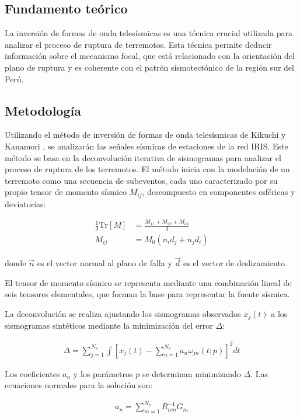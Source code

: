 \documentclass[spanish,a4paper,11pt]{article}
\begin{document}
\subsection{Fundamento teórico}

La inversión de formas de onda telesísmicas es una técnica crucial utilizada para analizar el proceso de ruptura de terremotos. Esta técnica permite deducir información sobre el mecanismo focal, que está relacionado con la orientación del plano de ruptura y es coherente con el patrón sismotectónico de la región sur del Perú.

\subsection{Metodología}
Utilizando el método de inversión de formas de onda telesísmicas de Kikuchi y Kanamori \cite{Kik2003}, se analizarán las señales sísmicas de estaciones de la red IRIS. Este método se basa en la deconvolución iterativa de sismogramas para analizar el proceso de ruptura de los terremotos. El método inicia con la modelación de un terremoto como una secuencia de subeventos, cada uno caracterizado por su propio tensor de momento sísmico \( M_{ij} \), descompuesto en componentes esféricas y deviatorias:

\begin{align}
  \frac{1}{3} \text{Tr}[M] & = \frac{M_{11} + M_{22} + M_{33}}{3}\\
  M_{ij} &= M_0(n_i d_j + n_j d_i)
\end{align}

donde \( \vec{n} \) es el vector normal al plano de falla y \( \vec{d} \) es el vector de deslizamiento.

El tensor de momento sísmico se representa mediante una combinación lineal de seis tensores elementales, que forman la base para representar la fuente sísmica.

La deconvolución se realiza ajustando los sismogramas observados \( x_j(t) \) a los sismogramas sintéticos mediante la minimización del error \( \Delta \):

\begin{align}
    \Delta = \sum_{j=1}^{N_s} \int \left[ x_j(t) - \sum_{n=1}^{N_b} a_n \omega_{jn}(t; p) \right]^2 dt
\end{align}

Los coeficientes \( a_n \) y los parámetros \( p \) se determinan minimizando \( \Delta \). Las ecuaciones normales para la solución son:

\begin{align}
    a_n = \sum_{m=1}^{N_b} R_{nm}^{-1} G_m
\end{align}
\end{document}
